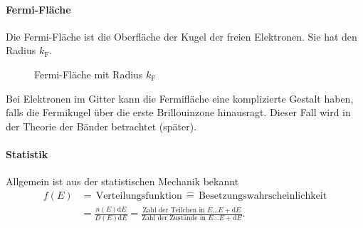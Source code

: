 \paragraph{Fermi-Fläche}
	Die Fermi-Fläche ist die Oberfläche der Kugel der freien Elektronen. Sie hat den Radius $k_\mathrm F$. 

	\begin{figure}[H]
		\centering
		\caption{Fermi-Fläche mit Radius $k_\mathrm F$}
		\label{fig:vl25_abbildung_4}
	\end{figure}
	Bei Elektronen im Gitter kann die Fermifläche eine komplizierte Gestalt haben, falls die Fermikugel über die erste Brillouinzone hinausragt. 
	Dieser Fall wird in der Theorie der Bänder betrachtet (später).

\paragraph{Statistik} Allgemein ist aus der statistischen Mechanik bekannt
	$$\begin{aligned}
	f(E) &= \, \text{Verteilungsfunktion}\, \hat{=} \, \text{Besetzungswahrscheinlichkeit} \\
	&= \frac{n(E)\mathrm{d}E}{D(E) \mathrm{d}E} = \frac{\text{Zahl der Teilchen in } E \ldots E + \mathrm{d}E}{\text{Zahl der Zustände in } E \ldots E + \mathrm{d} E}.
	\end{aligned}$$

